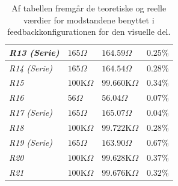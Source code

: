 \begin{table}[H]
\begin{tabular}{|l|l|l|l|}
\textit{R13 (Serie)}    & $165\Omega$              & $164.59\Omega$      & $0.25\%$           \\ \hline
\textit{R14 (Serie)}    & $165\Omega$              & $164.54\Omega$      & $0.28\%$           \\ \hline
\textit{R15}            & $100$K$\Omega$           & $99.660$K$\Omega$   & $0.34\%$           \\ \hline
\textit{R16}            & $56\Omega$               & $56.04\Omega$       & $0.07\%$           \\ \hline
\textit{R17 (Serie)}    & $165\Omega$              & $165.07\Omega$      & $0.04\%$           \\ \hline
\textit{R18}            & $100$K$\Omega$           & $99.722$K$\Omega$   & $0.28\%$           \\ \hline
\textit{R19 (Serie)}    & $165\Omega$              & $163.90\Omega$      & $0.67\%$           \\ \hline
\textit{R20}            & $100$K$\Omega$           & $99.628$K$\Omega$   & $0.37\%$           \\ \hline
\textit{R21}            & $100$K$\Omega$           & $99.676$K$\Omega$   & $0.32\%$           \\ \hline
\end{tabular}
\caption{Af tabellen fremgår de teoretiske og reelle værdier for modstandene benyttet i feedbackkonfigurationen for den visuelle del.}
\label{Tab:komparator_modstande}
\end{table}

